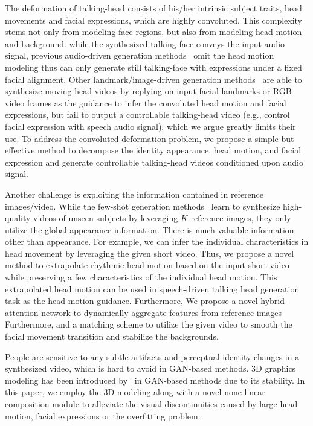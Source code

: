 \documentclass[runningheads]{llncs}
\begin{document}
The deformation of talking-head consists of his/her intrinsic subject traits, head movements and facial expressions, which are highly convoluted. This complexity stems not only from modeling face regions, but also from modeling head motion and background. while the synthesized talking-face conveys the input audio signal, previous audio-driven generation methods~\cite{Chung18b,wiles2018x2face,zhou2019talking,chen2018lip,ijcai2019-129,chen2019hierarchical} omit the head motion modeling thus can only generate still talking-face with expressions under a fixed facial alignment. Other landmark/image-driven generation methods~\cite{zakharov2019few,wang2018fewshotvid2vid,wang2018vid2vid,wang2018high,wiles2018x2face} are able to synthesize moving-head videos by replying on input facial landmarks or RGB video frames as the guidance to infer the convoluted head motion and facial expressions, but fail to output a controllable talking-head video (e.g., control facial expression with speech audio signal), which we argue greatly limits their use. To address the convoluted deformation problem, we propose a simple but effective method to decompose the identity appearance, head motion, and facial expression and generate controllable talking-head videos conditioned upon audio signal.     

Another challenge is exploiting the information contained in reference images/video. While the few-shot generation methods~\cite{zakharov2019few,wang2018fewshotvid2vid,liu2019few,yoo2019coloring} learn to synthesize high-quality videos of unseen subjects by leveraging $K$ reference images, they only utilize the global appearance information. There is much valuable information other than appearance. For example, we can infer the individual characteristics in head movement by leveraging the given short video. Thus, we propose a novel method to extrapolate rhythmic head motion based on the input short video while preserving a few characteristics of the individual head motion. This extrapolated head motion can be used in speech-driven talking head generation task as the head motion guidance. Furthermore, We propose a novel hybrid-attention network to dynamically aggregate features from reference images Furthermore, and a matching scheme to utilize the given video to smooth the facial movement transition and stabilize the backgrounds.

People are sensitive to any subtle artifacts and perceptual identity changes in a synthesized video, which is hard to avoid in GAN-based methods. 3D graphics modeling has been introduced by~\cite{fried2019text,kim2018deep} in GAN-based methods due to its stability. In this paper, we employ the 3D modeling along with a novel none-linear composition module to alleviate the visual discontinuities caused by large head motion, facial expressions or the overfitting problem. 
\end{document}
